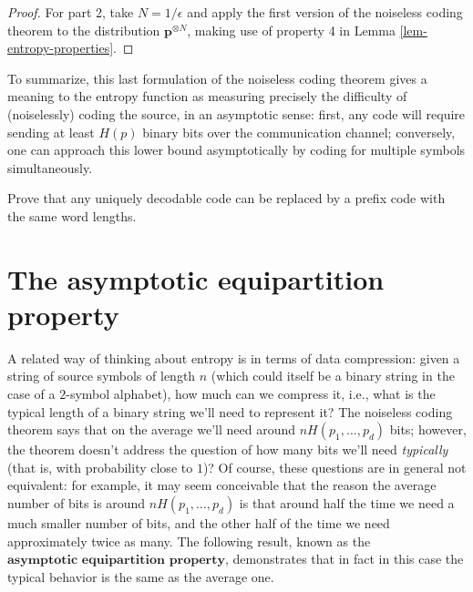 \begin{proof}
For part 2, take $N=1/\epsilon$ and apply the first
version of the noiseless coding theorem to the
distribution $\mathbf{p}^{\otimes N}$, making use of
property 4 in Lemma \ref{lem-entropy-properties}.
\end{proof}

\noindent To summarize, this last formulation of the noiseless
coding theorem gives a meaning to the entropy function
as measuring precisely the difficulty of (noiselessly)
coding the source, in an asymptotic sense: first, any
code will require sending at least $H(p)$ binary bits
over the communication channel; conversely, one can
approach this lower bound asymptotically by coding for
multiple symbols simultaneously.

\begin{xexercise}
\label{exer-uniquely-decodable}
Prove that any uniquely decodable code can be
replaced by a prefix code with the same word lengths.
\end{xexercise}

\section{The asymptotic equipartition property}
A related way of thinking about entropy is in terms
of data compression: given a string of source symbols
of length $n$ (which could itself be a binary string
in the case of a $2$-symbol alphabet), how much can
we compress it, i.e., what is the typical length of a
binary string we'll need to represent it? The
noiseless coding theorem says that on the average
we'll need around $n H(p_1,\ldots,p_d)$ bits;
however, the theorem doesn't address the question of
how many bits we'll need \emph{typically} (that is, with
probability close to $1$)? Of course, these questions
are in general not equivalent: for example, it may
seem conceivable that the reason the average number of
bits is around $nH(p_1,\ldots,p_d)$ is that around
half the time we need a much smaller number of bits,
and the other half of the time we need approximately
twice as many. The following result, known as the
$\textbf{asymptotic equipartition property}$,
demonstrates that in fact in this case the typical
behavior is the same as the average one.

